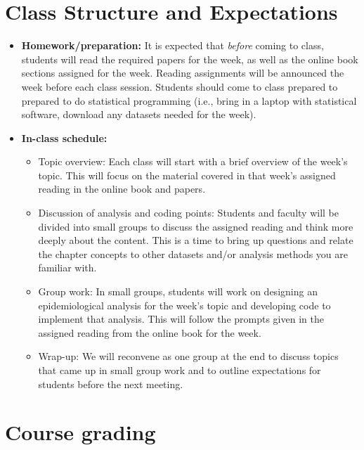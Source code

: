 \documentclass[
]{book}
\providecommand{\tightlist}{%
  \setlength{\itemsep}{0pt}\setlength{\parskip}{0pt}}
\begin{document}
\hypertarget{class-structure-and-expectations}{%
\section{Class Structure and Expectations}\label{class-structure-and-expectations}}

\begin{itemize}
\tightlist
\item
  \textbf{Homework/preparation:}
  It is expected that \emph{before} coming to class, students will read the required
  papers for the week, as well as the online book sections assigned for the week.
  Reading assignments will be announced the week before each class session.
  Students should come to class prepared to prepared to do
  statistical programming (i.e., bring in a laptop with statistical software,
  download any datasets needed for the week).
\item
  \textbf{In-class schedule:}

  \begin{itemize}
  \tightlist
  \item
    Topic overview: Each class will start with a brief overview of the week's
    topic. This will focus on the material covered in that week's assigned
    reading in the online book and papers.
  \item
    Discussion of analysis and coding points: Students and faculty will be
    divided into small groups to discuss the assigned reading and think more deeply about
    the content. This is a time to bring up questions and relate the chapter
    concepts to other datasets and/or analysis methods you are familiar with.
  \item
    Group work: In small groups, students will work on designing an
    epidemiological analysis for the week's topic and developing code to
    implement that analysis. This will follow the prompts given in the assigned
    reading from the online book for the week.
  \item
    Wrap-up: We will reconvene as one group at the end to discuss topics that
    came up in small group work and to outline expectations for students before
    the next meeting.
  \end{itemize}
\end{itemize}

\hypertarget{course-grading}{%
\section{Course grading}\label{course-grading}}
\end{document}

